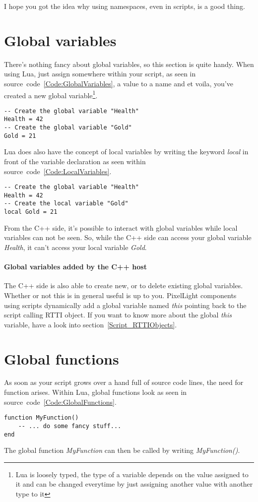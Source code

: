 I hope you got the idea why using namespaces, even in scripts, is a good thing.




\section{Global variables}
\label{Script_GlobalVariables}
There's nothing fancy about global variables, so this section is quite handy. When using Lua, just assign somewhere within your script, as seen in source~code~\ref{Code:GlobalVariables}, a value to a name and et voila, you've created a new global variable\footnote{Lua is loosely typed, the type of a variable depends on the value assigned to it and can be changed everytime by just assigning another value with another type to it}.
\begin{lstlisting}[float=htb,label=Code:GlobalVariables,caption={Global variables}]
-- Create the global variable "Health"
Health = 42
-- Create the global variable "Gold"
Gold = 21
\end{lstlisting}

Lua does also have the concept of local variables by writing the keyword \emph{local} in front of the variable declaration as seen within source~code~\ref{Code:LocalVariables}.
\begin{lstlisting}[float=htb,label=Code:LocalVariables,caption={Local variables}]
-- Create the global variable "Health"
Health = 42
-- Create the local variable "Gold"
local Gold = 21
\end{lstlisting}
From the C++ side, it's possible to interact with global variables while local variables can not be seen. So, while the C++ side can access your global variable \emph{Health}, it can't access your local variable \emph{Gold}.

\paragraph{Global variables added by the C++ host}
The C++ side is also able to create new, or to delete existing global variables. Whether or not this is in general useful is up to you. PixelLight components using scripts dynamically add a global variable named \emph{this} pointing back to the script calling RTTI object. If you want to know more about the global \emph{this} variable, have a look into section~\ref{Script_RTTIObjects}.





\section{Global functions}
\label{Script_GlobalFunctions}
As soon as your script grows over a hand full of source code lines, the need for function arises. Within Lua, global functions look as seen in source~code~\ref{Code:GlobalFunctions}.
\begin{lstlisting}[float=htb,label=Code:GlobalFunctions,caption={Global functions}]
function MyFunction()
	-- ... do some fancy stuff...
end
\end{lstlisting}
The global function \emph{MyFunction} can then be called by writing \emph{MyFunction()}.

